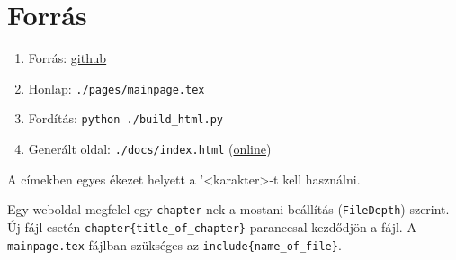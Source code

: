 \chapter{Forr\'as}

\begin{enumerate}
    \item[] Forrás: \href{https://github.com/a-gondolkodas-orome/latex-tutorial}{github} 
    \item[] Honlap: \texttt{./pages/mainpage.tex}
    \item[] Fordítás: \texttt{python ./build\_html.py} 
    \item[] Generált oldal: \texttt{./docs/index.html} (\href{https://a-gondolkodas-orome.github.io/latex-tutorial/index.html}{online})
\end{enumerate}
        
A címekben egyes ékezet helyett a  '<karakter>-t kell használni. 

Egy weboldal megfelel egy \texttt{\bs chapter}-nek a mostani beállítás (\texttt{FileDepth}) szerint. 
Új fájl esetén \texttt{\bs chapter\{title\_of\_chapter\}} paranccsal kezdődjön a fájl. A \texttt{mainpage.tex} fájlban szükséges az \texttt{\bs include\{name\_of\_file\}}.

